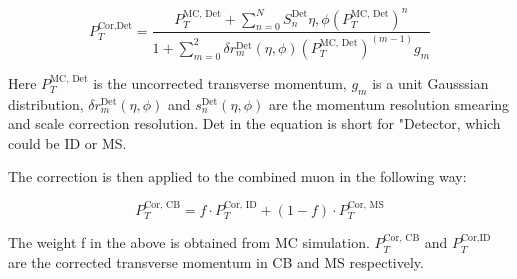 
\begin{equation}
    P_{T}^{\textrm{Cor,Det}} = \frac{P^{\textrm{MC, Det}}_{T} + \sum_{n=0}^{N} S_{n}^{\textrm{Det}}{\eta, \phi}(P_{T}^\textrm{{MC, Det}})^n}{1+\sum_{m=0}^{2}\delta r_{m}^{\textrm{Det}}(\eta, \phi)(P_{T}^{\textrm{MC, Det}})^(m-1) g_{m}}
\label{eq:muoncalib}
\end{equation}

Here $P_{T}^{\textrm{MC, Det}}$ is the uncorrected transverse momentum, $g_m$ is a unit Gausssian distribution, $\delta r^{\textrm{Det}}_{m}(\eta, \phi)$ and $s_{n}^{\textrm{Det}}(\eta, \phi)$ are the momentum resolution smearing and scale correction resolution. Det in the equation is short for "Detector, which could be ID or MS.

The correction is then applied to the combined muon in the following way:

\begin{equation}
    P_{T}^{\textrm{Cor, CB}} = f \cdot P_{T}^{\textrm{Cor, ID}}+ (1-f) \cdot P_{T}^{\textrm{Cor, MS}}
\label{eq:muoncalibfactor}
\end{equation}

The weight f in the above is obtained from MC simulation. $P_T^{\textrm{Cor, CB}}$ and $P_T^{\textrm{Cor,ID}}$ are the corrected transverse momentum in CB and MS respectively.





%
%
%
%
%
%

